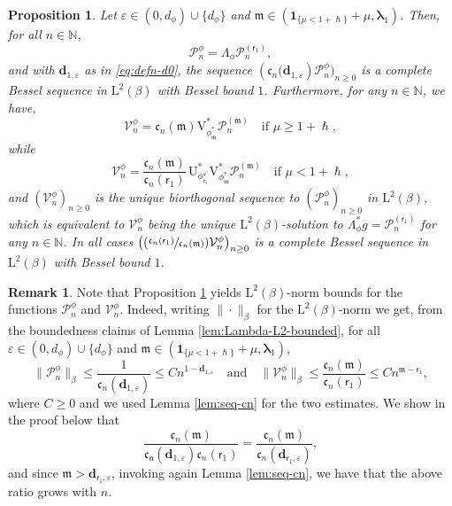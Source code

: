 \documentclass[JEP,XML,SOM,Unicode]{cedram}
\let\epsilon\varepsilon
\newcommand{\Psfrac}[2]{(\sfrac{#1}{#2})}
\theoremstyle{plain}
\newtheorem{proposition}[theorem]{Proposition}
\theoremstyle{definition}
\newtheorem{remark}[theorem]{Remark}
\newcommand{\N}{\mathbb{N}}
\renewcommand{\P}{\mathcal{P}}
\newcommand{\V}{\mathcal{V}}
\newcommand{\Leb}{\mathrm{L}}
\newcommand{\m}{\mathfrak{m}}
\newcommand{\dpt}{\bm{d}_{\vat,\epsilon}}
\newcommand{\dz}{{\bm{d}}_{1,\epsilon}}
\newcommand{\lam}{{\bm{\lambda}_1}}
\newcommand{\vat}{{\mathsf{r}_1}}
\newcommand{\phm}{{\phi_\m^*}}
\renewcommand{\varphi}{{\phi_{\vat}^{\checkmark}}}
\let\h\hslash
\let\mo\mu
\let\bpsi\beta
\begin{document}
\begin{proposition}
\label{prop:riesz}
Let $\epsilon \in (0,d_\phi) \cup \{d_\phi\}$ and $\m \in (\bm{1}_{\{\mo < 1+\h\}} + \mo ,\lam)$. Then,
for all $n \in \N$,
\begin{equation}
\label{eq:alt-V-n-0}
\P_n^\phi = \Lambda_{\phi} \P_n^{(\vat)},
\end{equation}
and with $\dz$ as in \eqref{eq:defn-d0}, the sequence $\left(\mathfrak{c}_n(\dz\right)\P_n^\phi)_{n \geq 0}$ is a complete Bessel sequence in $\Leb^2(\bpsi)$ with Bessel bound $1$. Furthermore, for any $n \in \N$, we have,
\begin{equation}
\label{eq:alt-V-n}
\V_n^\phi = \mathfrak{c}_n(\m) \mathrm{V}_{\phm}^*\P_n^{(\m)} \quad \mbox{if } \mo \geq 1+\h,
\end{equation}
while
\begin{equation*}
\V_n^\phi = \frac{\mathfrak{c}_n(\m)}{\mathfrak{c}_n(\vat)}\, {\mathrm{U}}_\varphi^* \mathrm{V}_{\phm}^*\P_n^{(\m)}
\quad \mbox{if } \mo < 1+\h,
\end{equation*}
and $(\V_n^\phi)_{n \geq 0}$ is the unique biorthogonal sequence to $(\P_n^\phi)_{n \geq 0}$ in $\Leb^2(\bpsi)$, which is equivalent to $\V_n^\phi$ being the unique $\Leb^2(\bpsi)$-solution to $\Lambda_\phi^* g = \P_n^{(\vat)}$ for any $n \in \N$. In all cases $\bigl(\Psfrac{\mathfrak{c}_n(\vat)}{\mathfrak{c}_n(\m)} \V_n^\phi\bigr)_{n \geq 0}$ is a complete Bessel sequence in $\Leb^2(\bpsi)$ with Bessel bound $1$.
\end{proposition}
\begin{remark}\label{rem:bounds}
Note that Proposition \ref{prop:riesz} yields $\Leb^2(\bpsi)$-norm bounds for the functions $\P_n^\phi$ and $\V_n^\phi$. Indeed, writing $\|{\cdot}\|_\bpsi$ for the $\Leb^2(\bpsi)$-norm we get, from the boundedness claims of Lemma \ref{lem:Lambda-L2-bounded}, for all $\epsilon \in (0,d_\phi) \cup \{d_\phi\}$ and $\m \in (\bm{1}_{\{\mo < 1+\h\}} + \mo,\lam)$,
\begin{equation*}
\|\P_n^\phi\|_\bpsi \leq \frac{1}{\mathfrak{c}_n(\dz)}\leq C n^{1-\dz} \quad \text{and} \quad \|\V_n^\phi\|_\bpsi \leq \frac{\mathfrak{c}_n(\m)}{\mathfrak{c}_n(\vat)}\leq C n^{\m-\vat},
\end{equation*}
where $C \ge 0$ and we used Lemma \ref{lem:seq-cn} for the two estimates.
We show in the proof below that
\begin{equation*}
\frac{\mathfrak{c}_n(\m)}{\mathfrak{c_n}(\dz)\mathfrak{c}_n(\vat)} = \frac{\mathfrak{c}_n(\m)}{\mathfrak{c}_n(\dpt)},
\end{equation*}
and since $\m > \dpt$, invoking again Lemma \ref{lem:seq-cn}, we have that the above ratio grows with $n$.
\end{remark}
\end{document}
